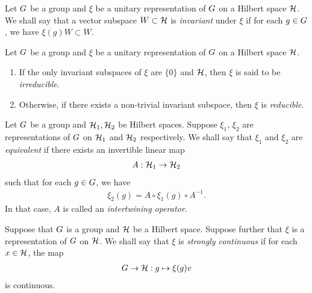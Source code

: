\begin{definition}
\label{definition:invariant_subspaces}
    Let $G$ be a group and $\xi$ be a unitary representation of $G$ on a Hilbert space $\mathcal{H}$.
    We shall say that a vector subspace $W \subset \mathcal{H}$ is \emph{invariant} under $\xi$
    if for each $g \in G$, we have $\xi(g) W \subset W$.
\end{definition}

\begin{definition}[Irreducibility]
\label{definition:irreducible_representations}
    Let $G$ be a group and $\xi$ be a unitary representation of $G$ on a Hilbert space $\mathcal{H}$.
    \begin{enumerate}
        \item If the only invariant subspaces of $\xi$ are $\{0\}$ and $\mathcal{H}$,
            then $\xi$ is said to be \emph{irreducible}.
        \item Otherwise, if there exists a non-trivial invariant subspace,
            then $\xi$ is \emph{reducible}.
    \end{enumerate}
\end{definition}

\begin{definition}
\label{definition:equivalent_representations}
    Let $G$ be a group and $\mathcal{H}_1, \mathcal{H}_2$ be Hilbert spaces.
    Suppose $\xi_1$, $\xi_2$ are representations of $G$ on $\mathcal{H}_1$ and $\mathcal{H}_2$ respectively.
    We shall say that $\xi_1$ and $\xi_2$ are \emph{equivalent}
    if there exists an invertible linear map
    \begin{align*}
        A : \mathcal{H}_1 \to \mathcal{H}_2
    \end{align*}
    such that for each $g \in G$, we have
    \begin{align*}
        \xi_2(g) = A \circ \xi_1(g) \circ A^{-1}.
    \end{align*}
    In that case, $A$ is called an \emph{intertwining operator}.
\end{definition}

\begin{definition}
\label{definition:strongly_continuous_representation}
    Suppose that $G$ is a group and $\mathcal{H}$ be a Hilbert space.
    Suppose further that $\xi$ is a representation of $G$ on $\mathcal{H}$.
    We shall say that $\xi$ is \emph{strongly continuous}
    if for each $x \in \mathcal{H}$,
    the map
    \begin{align*}
        G \to \mathcal{H} : g \mapsto \xi(g) v
    \end{align*}
    is continuous.
\end{definition}

